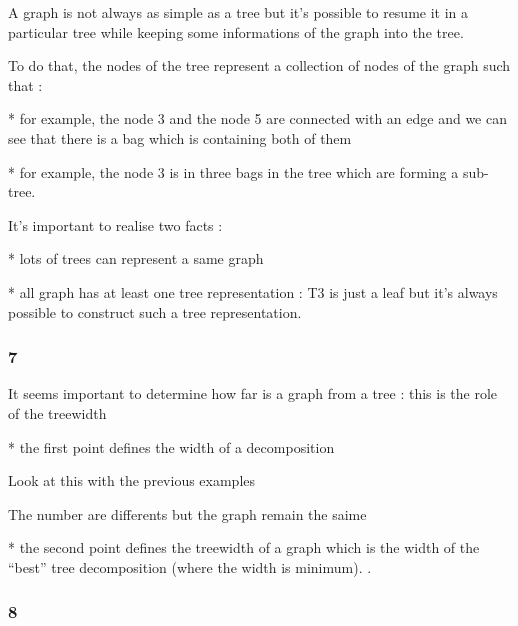 \documentclass[a4paper, 10pt,french,landscape]{article}
\begin{document}
\begin{multicols}{3}
A graph is not always as simple as a tree but it's possible to resume it  in a particular tree while keeping some  informations of the graph  into the tree. 

To do that, the nodes of the tree represent a collection of nodes of the graph such that :   

* for example, the node 3 and the node 5 are connected with an edge and we can see that there is a bag which is containing both of them

* for example, the node 3 is in three bags in the tree which are forming a sub-tree.

It's important to realise two facts : 

* lots of  trees can represent a same graph

* all graph has at least one tree representation : T3 is just a leaf but it's always possible to construct such a tree representation.


\subsubsection*{ 7}


It seems important to determine how far is a graph from a tree : this is the role of the treewidth

* the first point defines the width of a decomposition

Look at this with the previous examples


The number are differents but the graph remain the saime

* the second point defines the treewidth of a graph which is the width of the ``best'' tree decomposition (where the width is minimum).
.








\subsubsection*{ 8}


\end{multicols}
\end{document}
